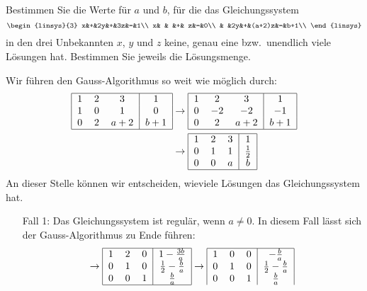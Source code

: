Bestimmen Sie die Werte für $a$ und $b$, für die das Gleichungssystem
\[
\begin{linsys}{3}
x&+&2y&+&3z&=&1\\
x& &  &+& z&=&0\\
 & &2y&+&(a+2)z&=&b+1\\
\end{linsys}
\]
in den drei Unbekannten $x$, $y$ und $z$ keine, genau eine bzw.~unendlich
viele Lösungen hat. Bestimmen Sie jeweils die Lösungsmenge.

\begin{loesung}
Wir führen den Gauss-Algorithmus so weit wie möglich durch:
\begin{align*}
\begin{tabular}{|ccc|c|}
\hline
1&2&3&1\\
1&0&1&0\\
0&2&$a+2$&$b+1$\\
\hline
\end{tabular}
&\rightarrow
\begin{tabular}{|ccc|c|}
\hline
1&2&3&1\\
0&$-2$&$-2$&$-1$\\
0&2&$a+2$&$b+1$\\
\hline
\end{tabular}
\\
&\rightarrow
\begin{tabular}{|ccc|c|}
\hline
1&2&3&1\\
0&1&1&$\frac12$\\
0&0&$a$&$b$\\
\hline
\end{tabular}
\end{align*}
An dieser Stelle können wir entscheiden, wieviele Lösungen das Gleichungssystem
hat.
\begin{enumerate}
\item[Fall 1:]
Das Gleichungssystem ist regulär, wenn $a\ne 0$. In diesem Fall lässt sich der
Gauss-Algorithmus zu Ende führen:
\[
\rightarrow
\begin{tabular}{|ccc|c|}
\hline
1&2&0&$1-\frac{3b}{a}$\\
0&1&0&$\frac12-\frac{b}{a}$\\
0&0&1&$\frac{b}{a}$\\
\hline
\end{tabular}
\rightarrow
\begin{tabular}{|ccc|c|}
\hline
1&0&0&$-\frac{b}{a}$\\
0&1&0&$\frac12-\frac{b}{a}$\\
0&0&1&$\frac{b}{a}$\\

\end{tabular}\]
\end{enumerate}
\end{loesung}
